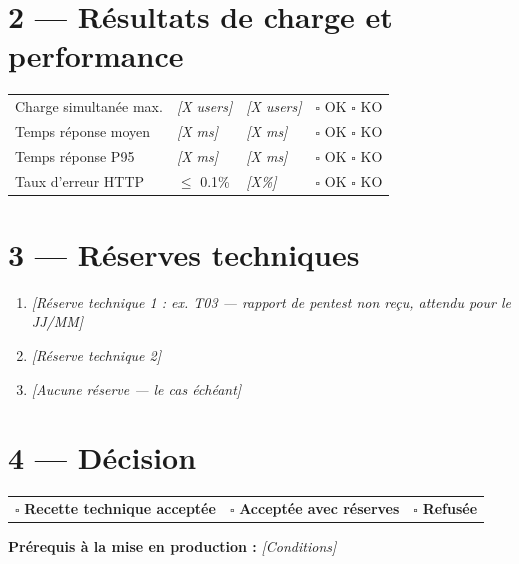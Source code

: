 \documentclass[11pt,a4paper,oneside]{report}
\begin{document}
\section*{2 — Résultats de charge et performance}

\renewcommand{\arraystretch}{1.3}
\begin{tabularx}{\textwidth}{L{4cm} C{3cm} C{3cm} Y}
\toprule
{} &  &  &  \\
\midrule
Charge simultanée max. & \textit{[X users]} & \textit{[X users]} & $\square$ OK \quad $\square$ KO \\
Temps réponse moyen    & \textit{[X ms]} & \textit{[X ms]} & $\square$ OK \quad $\square$ KO \\
Temps réponse P95      & \textit{[X ms]} & \textit{[X ms]} & $\square$ OK \quad $\square$ KO \\
Taux d'erreur HTTP     & $\leq$ 0.1\%       & \textit{[X\%]}   & $\square$ OK \quad $\square$ KO \\
\bottomrule
\end{tabularx}

\section*{3 — Réserves techniques}

\begin{enumerate}
  \item \textit{[Réserve technique 1 : ex. T03 — rapport de pentest non reçu, attendu pour le JJ/MM]}
  \item \textit{[Réserve technique 2]}
  \item \textit{[Aucune réserve — le cas échéant]}
\end{enumerate}

\section*{4 — Décision}

\begin{tcolorbox}[
  colback=cnLightBlue, colframe=cnNavy,
  leftrule=4pt, rightrule=0pt, toprule=0pt, bottomrule=0pt,
  arc=0pt, boxsep=6pt, top=6pt, bottom=6pt, left=6pt, right=6pt]

\renewcommand{\arraystretch}{1.5}
\begin{tabularx}{\textwidth}{ccc}
\cellcolor{cnGreen!25}\large $\square$ \textbf{Recette technique acceptée}
& \cellcolor{cnOrange!25}\large $\square$ \textbf{Acceptée avec réserves}
& \cellcolor{cnRed!25}\large $\square$ \textbf{Refusée} \\
\end{tabularx}

\vspace{6pt}
\textbf{Prérequis à la mise en production :} \textit{[Conditions]}

\end{tcolorbox}
\end{document}
